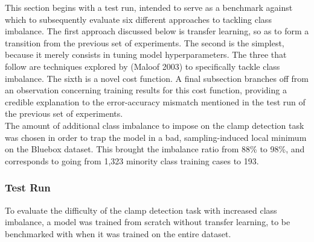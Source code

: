 \documentclass[a4paper,11pt]{article}
\begin{document}
This section begins with a test run, intended to serve as a benchmark against which to subsequently evaluate six different approaches to tackling class imbalance. The first approach discussed below is transfer learning, so as to form a transition from the previous set of experiments. The second is the simplest, because it merely consists in tuning model hyperparameters. The three that follow are techniques explored by (Maloof 2003) \cite{maloof} to specifically tackle class imbalance. The sixth is a novel cost function. A final subsection branches off from an observation concerning training results for this cost function, providing a credible explanation to the error-accuracy mismatch mentioned in the test run of the previous set of experiments. \\

The amount of additional class imbalance to impose on the clamp detection task was chosen in order to trap the model in a bad, sampling-induced local minimum on the Bluebox dataset. This brought the imbalance ratio from 88\% to 98\%, and corresponds to going from 1,323 minority class training cases to 193. \\

\subsubsection{Test Run}

To evaluate the difficulty of the clamp detection task with increased class imbalance, a model was trained from scratch without transfer learning, to be benchmarked with when it was trained on the entire dataset. 
\end{document}
